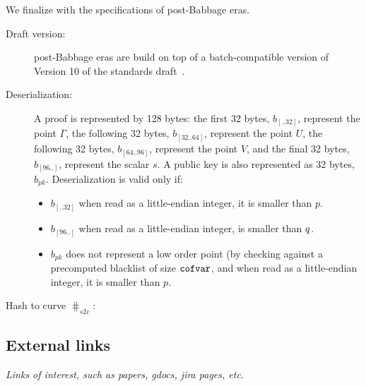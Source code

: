 We finalize with the specifications of post-Babbage eras.
\begin{description}
\item[Draft version:] post-Babbage eras are build on top of a batch-compatible version of  Version 10 of the standards draft~\cite{vrfdraft}.
\item[Deserialization:] A \vrf proof is represented by 128 bytes: the first 32 bytes, $b_{[..32]}$, represent the point $\Gamma$, the following 32 bytes, $b_{[32..64]}$, represent the point $U$, the following 32 bytes, $b_{[64..96]}$, represent the point $V$, and the final 32 bytes, $b_{[96..]}$, represent the scalar $s$. A public key is also represented as 32 bytes, $b_{pk}$. Deserialization is valid only if:
\begin{itemize}
\item $b_{[..32]}$ when read as a little-endian integer, it is smaller than $p$.
\item $b_{[96..]}$ when read as a little-endian integer, is smaller than $q$.
\item $b_{pk}$ does not represent a low order point (by checking against a precomputed blacklist of size $\texttt{cofvar}$, and when read as a little-endian integer, it is smaller than $p$.
\end{itemize}
\item[Hash to curve $\hash_{s2c}$:]
\end{description}
\subsection{External links}
\printbibliography[heading=subbibintoc]
\textit{Links of interest, such as papers, gdocs, jira pages, etc.}
